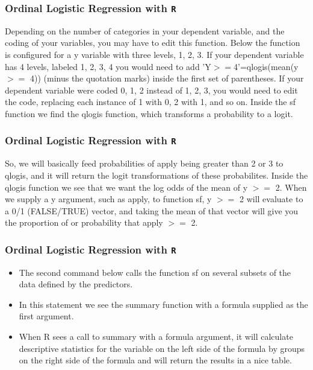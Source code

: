 \documentclass[00-GLMregslides.tex]{subfiles}
\begin{document}
\begin{frame}[fragile]
	
	\frametitle{Ordinal Logistic Regression with \texttt{R}}
	\Large
	
	Depending on the number of categories in your dependent variable, and the coding of your variables, you may have to edit this function. Below the function is configured for a y variable with three levels, 1, 2, 3. If your dependent variable has 4 levels, labeled 1, 2, 3, 4 you would need to add 'Y$>=$4'=qlogis(mean(y $>=$ 4)) (minus the quotation marks) inside the first set of parentheses. If your dependent variable were coded 0, 1, 2 instead of 1, 2, 3, you would need to edit the code, replacing each instance of 1 with 0, 2 with 1, and so on. Inside the sf function we find the qlogis function, which transforms a probability to a logit. 
	
\end{frame}
\begin{frame}[fragile]
	
	\frametitle{Ordinal Logistic Regression with \texttt{R}}
	\Large
	So, we will basically feed probabilities of apply being greater than 2 or 3 to qlogis, and it will return the logit transformations of these probabilites. Inside the qlogis function we see that we want the log odds of the mean of y $>=$ 2. When we supply a y argument, such as apply, to function sf, y $>=$ 2 will evaluate to a 0/1 (FALSE/TRUE) vector, and taking the mean of that vector will give you the proportion of or probability that apply $>=$ 2.
\end{frame}
\begin{frame}[fragile]
	
	\frametitle{Ordinal Logistic Regression with \texttt{R}}
	\Large
	\begin{itemize}
	\item The second command below calls the function sf on several subsets of the data defined by the predictors. 
	\item In this statement we see the summary function with a formula supplied as the first argument. 
	\item When R sees a call to summary with a formula argument, it will calculate descriptive statistics for the variable on the left side of the formula by groups on the right side of the formula and will return the results in a nice table. 
	\end{itemize}
\end{frame}
\end{document}
